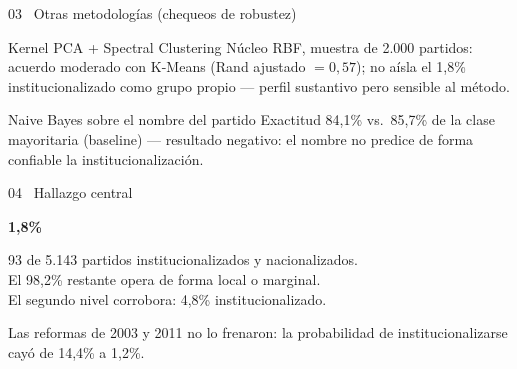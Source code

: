 \documentclass[11pt,aspectratio=169]{beamer}
\begin{document}
\begin{frame}{03 \textbullet\ Otras metodologías (chequeos de robustez)}
\begin{block}{Kernel PCA + Spectral Clustering}
Núcleo RBF, muestra de 2.000 partidos: acuerdo moderado con K-Means (Rand ajustado $=0,57$); no aísla el 1,8\% institucionalizado como grupo propio --- perfil sustantivo pero sensible al método.
\end{block}
\begin{block}{Naive Bayes sobre el nombre del partido}
Exactitud 84,1\% vs.\ 85,7\% de la clase mayoritaria (baseline) --- resultado negativo: el nombre no predice de forma confiable la institucionalización.
\end{block}
\end{frame}

\begin{frame}[plain]
\centering
\vspace{0.9cm}
{\color{white}\large 04 \textbullet\ Hallazgo central\par}
\vspace{0.4cm}
{\color{terra}\fontsize{46}{54}\selectfont\bfseries 1,8\%\par}
\vspace{0.2cm}
{\color{white}\normalsize 93 de 5.143 partidos institucionalizados y nacionalizados.\\ El 98,2\% restante opera de forma local o marginal.\\ El segundo nivel corrobora: 4,8\% institucionalizado.\par}
\vspace{0.5cm}
{\color{ice}\footnotesize Las reformas de 2003 y 2011 no lo frenaron: la probabilidad de institucionalizarse cayó de 14,4\% a 1,2\%.\par}
\end{frame}
\end{document}
